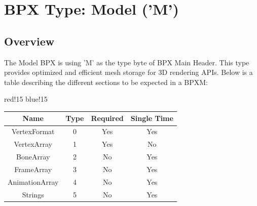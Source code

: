 \section{BPX Type: Model ('M')}

\subsection{Overview}
The Model BPX is using 'M' as the type byte of BPX Main Header. This type provides optimized and efficient mesh storage for 3D rendering APIs.
\newline
Below is a table describing the different sections to be expected in a BPXM:
\begin{center}
    {
        {red!15}
        {blue!15}
        \begin{tabular}{|c|c|c|c|}
            \hline
            \textbf{Name} & \textbf{Type} & \textbf{Required} & \textbf{Single Time} \\
    
            \hline\hline
            VertexFormat & 0 & Yes & Yes \\
            VertexArray & 1 & Yes & No \\
            BoneArray & 2 & No & Yes \\
            FrameArray & 3 & No & Yes \\
            AnimationArray & 4 & No & Yes \\
            Strings & 5 & No & Yes \\
            \hline
        \end{tabular}
    }
\end{center}

